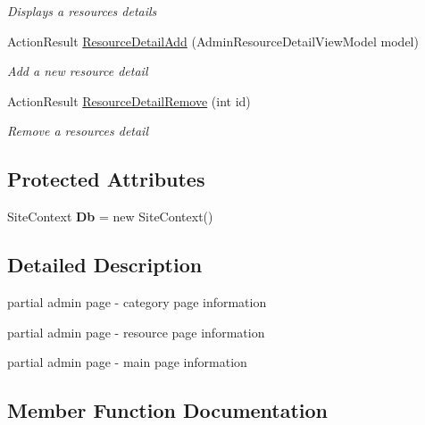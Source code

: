\begin{DoxyCompactItemize}
\begin{DoxyCompactList}\small\item\em Displays a resource\textquotesingle{}s details \end{DoxyCompactList}\item 
Action\+Result \mbox{\hyperlink{class_ox_tots_1_1_controllers_1_1_admin_controller_a9a86a506025cb853c3b7987c9e03ac03}{Resource\+Detail\+Add}} (Admin\+Resource\+Detail\+View\+Model model)
\begin{DoxyCompactList}\small\item\em Add a new resource detail \end{DoxyCompactList}\item 
Action\+Result \mbox{\hyperlink{class_ox_tots_1_1_controllers_1_1_admin_controller_a09639546af12d3452cd91d5cdc0b1d69}{Resource\+Detail\+Remove}} (int id)
\begin{DoxyCompactList}\small\item\em Remove a resource\textquotesingle{}s detail \end{DoxyCompactList}\end{DoxyCompactItemize}
\subsection*{Protected Attributes}
\begin{DoxyCompactItemize}
\item 
\mbox{\label{class_ox_tots_1_1_controllers_1_1_admin_controller_abc8722a4e0ed8a2f9cc1b43673169524}} 
Site\+Context {\bfseries Db} = new Site\+Context()
\end{DoxyCompactItemize}


\subsection{Detailed Description}
partial admin page -\/ category page information 

partial admin page -\/ resource page information

partial admin page -\/ main page information

\subsection{Member Function Documentation}
\mbox{\label{class_ox_tots_1_1_controllers_1_1_admin_controller_ac38aae229fe5869fe0d6ac580c858514}} 
